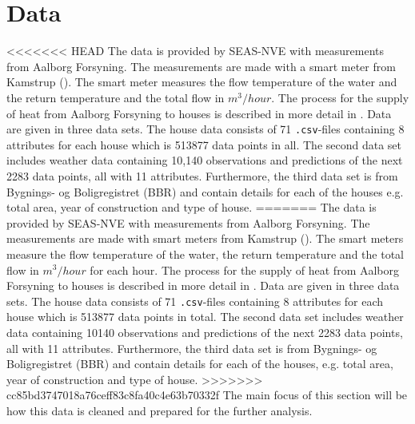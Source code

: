 \chapter{Data}
<<<<<<< HEAD
 The data is provided by SEAS-NVE with measurements from Aalborg Forsyning. The measurements are made with a smart meter from Kamstrup (\cite{Kamstrup}). The smart meter measures the flow temperature of the water and the return temperature and the total flow in $m^3/hour$. The process for the supply of heat from Aalborg Forsyning to houses is described in more detail in \cite{Aalborg}.
 Data are given in three data sets. The house data consists of 71 \texttt{.csv}-files containing 8 attributes for each house which is 513877 data points in all. The second data set includes weather data containing 10,140 observations and predictions of the next 2283 data points, all with 11 attributes. Furthermore, the third data set is from Bygnings- og Boligregistret (BBR) and contain details for each of the houses e.g. total area, year of construction and type of house.
=======
\label{chap: data}
 The data is provided by SEAS-NVE with measurements from Aalborg Forsyning. The measurements are made with smart meters from Kamstrup (\cite{Kamstrup}). The smart meters measure the flow temperature of the water, the return temperature and the total flow in $m^3/hour$ for each hour. The process for the supply of heat from Aalborg Forsyning to houses is described in more detail in \cite{Aalborg}.
 Data are given in three data sets. The house data consists of 71 \texttt{.csv}-files containing 8 attributes for each house which is 513877 data points in total. The second data set includes weather data containing 10140 observations and predictions of the next 2283 data points, all with 11 attributes. Furthermore, the third data set is from Bygnings- og Boligregistret (BBR) and contain details for each of the houses, e.g. total area, year of construction and type of house.
>>>>>>> cc85bd3747018a76ceff83c8fa40c4e63b70332f
The main focus of this section will be how this data is cleaned and prepared for the further analysis.

